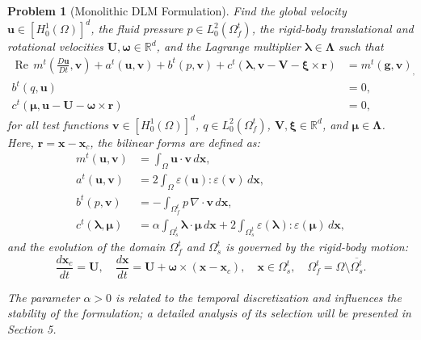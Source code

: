 \documentclass{article}
\newcommand{\bU}{{\mathbf{U}}}
\newcommand{\bx}{{\mathbf{x}}}
\newcommand{\bu}{{\mathbf{u}}}
\newcommand{\bv}{{\mathbf{v}}}
\newcommand{\br}{{\mathbf{r}}}
\newcommand{\Reynolds}{{\operatorname{Re}}}
\newtheorem{problem}{Problem}
\begin{document}
\begin{problem}[Monolithic DLM Formulation] \label{prob:final_dlm_form}
Find the global velocity $\bu \in [H^1_0(\Omega)]^d$, the fluid pressure $p \in L^2_0(\Omega_f^t)$, the rigid-body translational and rotational velocities $\bU, \boldsymbol{\omega} \in \mathbb{R}^d$, and the Lagrange multiplier $\boldsymbol{\lambda} \in \boldsymbol{\Lambda}$ such that
\begin{equation}\label{eq:final_monolithic_system}
    \begin{aligned}
        \Reynolds\, m^t\!\left( \frac{D\bu}{Dt}, \bv \right) + a^t(\bu,\bv) + b^t(p,\bv) + c^t(\boldsymbol{\lambda}, \bv - \mathbf{V} - \boldsymbol{\xi} \times \br) &= m^t(\mathbf{g},\bv)_, \\
        b^t(q, \bu) &= 0, \\
        c^t(\boldsymbol{\mu}, \bu - \bU - \boldsymbol{\omega} \times \br) &= 0,
    \end{aligned}
\end{equation}
for all test functions $\bv \in [H^1_0(\Omega)]^d$, $q \in L^2_0(\Omega_f^t)$, $\mathbf{V}, \boldsymbol{\xi} \in \mathbb{R}^d$, and $\boldsymbol{\mu} \in \boldsymbol{\Lambda}$. Here, $\br = \bx - \bx_c$, the bilinear forms are defined as:
\begin{equation}\label{eq:final_bilinear_forms}
    \begin{aligned}
        m^t(\bu,\bv) &= \int_{\Omega} \bu \cdot \bv  \,d\bx, \\
        a^t(\bu,\bv) &= 2 \int_{\Omega} \varepsilon(\bu) : \varepsilon(\bv)  \,d\bx, \\
        b^t(p,\bv) &= -\int_{\Omega_f^t} p \, \nabla \cdot \bv  \,d\bx, \\
        c^t(\boldsymbol{\lambda}, \boldsymbol{\mu}) &= \alpha \int_{\Omega_s^t} \boldsymbol{\lambda} \cdot \boldsymbol{\mu}  \,d\bx + 2 \int_{\Omega_s^t} \varepsilon(\boldsymbol{\lambda}) : \varepsilon(\boldsymbol{\mu})  \,d\bx,
    \end{aligned}
\end{equation}
and the evolution of the domain $\Omega_f^t$ and $\Omega_s^t$ is governed by the rigid-body motion:
\begin{equation}
    \frac{d\bx_c}{dt} = \bU, \quad \frac{d\bx}{dt} = \bU + \boldsymbol{\omega} \times (\bx - \bx_c), \quad \bx \in \Omega_s^t, \quad \Omega_f^t = \Omega \setminus \overline{\Omega_s^t}.
\end{equation}


The parameter $\alpha > 0$ is related to the temporal discretization and influences the stability of the formulation; a detailed analysis of its selection will be presented in Section 5.
\end{problem}
\end{document}
